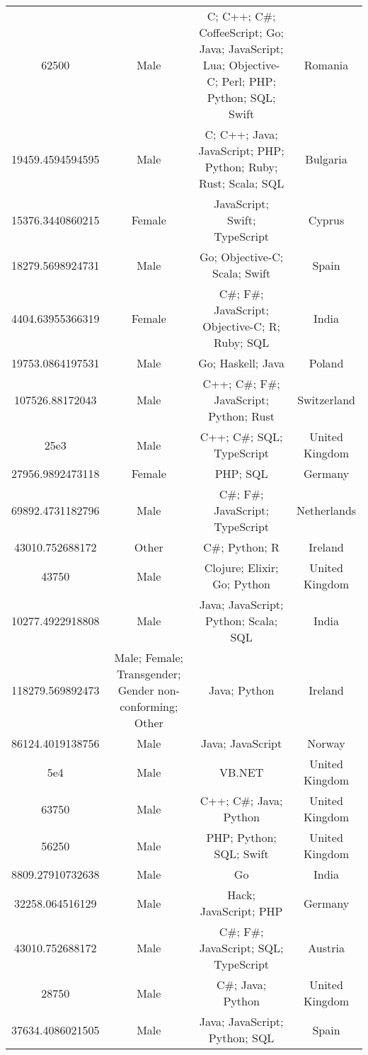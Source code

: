 \begin{center}
\begin{tabular}{ |c|c|c|c| }
62500  &  Male  &  C; C++; C\#; CoffeeScript; Go; Java; JavaScript; Lua; Objective-C; Perl; PHP; Python; SQL; Swift  &  Romania  \\ 
19459.4594594595  &  Male  &  C; C++; Java; JavaScript; PHP; Python; Ruby; Rust; Scala; SQL  &  Bulgaria  \\ 
15376.3440860215  &  Female  &  JavaScript; Swift; TypeScript  &  Cyprus  \\ 
18279.5698924731  &  Male  &  Go; Objective-C; Scala; Swift  &  Spain  \\ 
4404.63955366319  &  Female  &  C\#; F\#; JavaScript; Objective-C; R; Ruby; SQL  &  India  \\ 
19753.0864197531  &  Male  &  Go; Haskell; Java  &  Poland  \\ 
107526.88172043  &  Male  &  C++; C\#; F\#; JavaScript; Python; Rust  &  Switzerland  \\ 
25e3  &  Male  &  C++; C\#; SQL; TypeScript  &  United Kingdom  \\ 
27956.9892473118  &  Female  &  PHP; SQL  &  Germany  \\ 
69892.4731182796  &  Male  &  C\#; F\#; JavaScript; TypeScript  &  Netherlands  \\ 
43010.752688172  &  Other  &  C\#; Python; R  &  Ireland  \\ 
43750  &  Male  &  Clojure; Elixir; Go; Python  &  United Kingdom  \\ 
10277.4922918808  &  Male  &  Java; JavaScript; Python; Scala; SQL  &  India  \\ 
118279.569892473  &  Male; Female; Transgender; Gender non-conforming; Other  &  Java; Python  &  Ireland  \\ 
86124.4019138756  &  Male  &  Java; JavaScript  &  Norway  \\ 
5e4  &  Male  &  VB.NET  &  United Kingdom  \\ 
63750  &  Male  &  C++; C\#; Java; Python  &  United Kingdom  \\ 
56250  &  Male  &  PHP; Python; SQL; Swift  &  United Kingdom  \\ 
8809.27910732638  &  Male  &  Go  &  India  \\ 
32258.064516129  &  Male  &  Hack; JavaScript; PHP  &  Germany  \\ 
43010.752688172  &  Male  &  C\#; F\#; JavaScript; SQL; TypeScript  &  Austria  \\ 
28750  &  Male  &  C\#; Java; Python  &  United Kingdom  \\ 
37634.4086021505  &  Male  &  Java; JavaScript; Python; SQL  &  Spain  \\ 

\end{tabular}
\end{center}

